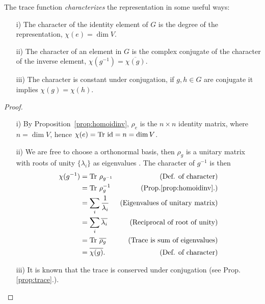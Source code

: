 \begin{proposition}\cite[Prop.2.1.]{Serre}\label{prop:charidinvconj}
	The trace function \emph{characterizes} the representation in some useful ways:
	\begin{enumerate}
		\item[i)] The character of the identity element of $G$ is the degree of the representation, $\chi(e) = \dim V$.
		\item[ii)] The character of an element in $G$ is the complex conjugate of the character of the inverse element, $\chi(g^{-1}) = \overline{\chi(g)}$.
		\item[iii)] The character is constant under conjugation, if $g,h\in G$ are conjugate it implies $\chi(g) = \chi(h)$.
	\end{enumerate}
\end{proposition}
\begin{proof}
	\begin{enumerate}
		\item[i)] By Proposition~\ref{prop:homoidinv}, $\rho_e$ is the $n \times n$ identity matrix, where $n = \dim V$, hence $\chi(e) = \text{Tr } \text{id} = n = \dim V$.
		\item[ii)] We are free to choose a orthonormal basis, then $\rho_g$ is a unitary matrix with roots of unity $\{\lambda_i\}$ as eigenvalues \cite[Exercise.8.6.15.]{Nicholson} . The character of $g^{-1}$ is then
		\begin{align*}
			\chi(g^{-1}) &= \text{Tr } \rho_{g^{-1}} & \text{(Def. of character)} \\
			&= \text{Tr } \rho_g^{-1} & \text{(Prop.\ref{prop:homoidinv}.)} \\
			&= \sum_i \frac{1}{\lambda_i} & \text{(Eigenvalues of unitary matrix)} \\
			&= \sum_i \overline{\lambda_i} & \text{(Reciprocal of root of unity)} \\
			&= \text{Tr } \overline{\rho_g} & \text{(Trace is sum of eigenvalues)} \\
			&= \overline{\chi(g)}. & \text{(Def. of character)}
		\end{align*}
		\item[iii)] It is known that the trace is conserved under conjugation (see Prop.\ref{prop:trace}.).\qedhere
	\end{enumerate}
\end{proof}

